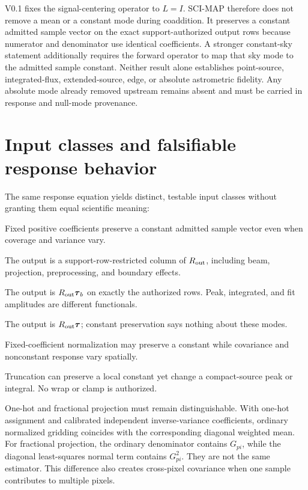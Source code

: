 \documentclass[10pt]{article}
\begin{document}
V0.1 fixes the signal-centering operator to \(L=I\). SCI-MAP therefore does not
remove a mean or a constant mode during coaddition. It preserves a constant
admitted sample vector on the exact support-authorized output rows because
numerator and denominator use identical coefficients. A stronger constant-sky
statement additionally requires the forward operator to map that sky mode to
the admitted sample constant. Neither result alone establishes point-source,
integrated-flux, extended-source, edge, or absolute astrometric fidelity. Any
absolute mode already removed upstream remains absent and must be carried in
response and null-mode provenance.

\clearpage
\section{Input classes and falsifiable response behavior}

The same response equation yields distinct, testable input classes without
granting them equal scientific meaning:

\begin{description}[style=nextline,leftmargin=1.8em]
\item[Constant.] Fixed positive coefficients preserve a constant admitted
sample vector even when coverage and variance vary.
\item[Delta or basis pixel.] The output is a support-row-restricted column of
\(R_{\rm out}\), including beam, projection, preprocessing, and boundary
effects.
\item[Point-source template.] The output is
\(R_{\rm out}\boldsymbol\tau_b\) on exactly the authorized rows. Peak,
integrated, and fit amplitudes are different functionals.
\item[Resolved, gradient, and Fourier structure.] The output is
\(R_{\rm out}\boldsymbol\tau\); constant preservation says nothing about these
modes.
\item[Variable coverage.] Fixed-coefficient normalization may preserve a
constant while covariance and nonconstant response vary spatially.
\item[Finite boundary.] Truncation can preserve a local constant yet change a
compact-source peak or integral. No wrap or clamp is authorized.
\end{description}

One-hot and fractional projection must remain distinguishable. With one-hot
assignment and calibrated independent inverse-variance coefficients, ordinary
normalized gridding coincides with the corresponding diagonal weighted mean.
For fractional projection, the ordinary denominator contains \(G_{pi}\), while
the diagonal least-squares normal term contains \(G_{pi}^2\). They are not the
same estimator. This difference also creates cross-pixel covariance when one
sample contributes to multiple pixels.
\end{document}
